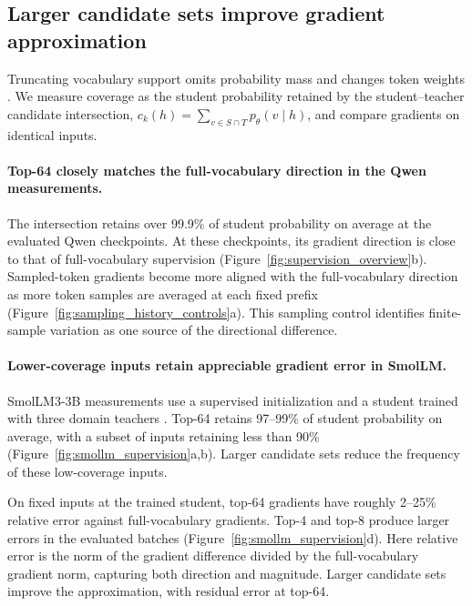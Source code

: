 \subsection{Larger candidate sets improve gradient approximation}
\label{sec:coverage_gradient}

Truncating vocabulary support omits probability mass and changes token weights \citep{anshumann2025sparse,huang2026tailaware}. We measure coverage as the student probability retained by the student--teacher candidate intersection, $c_k(h)=\sum_{v\in S\cap T}p_\theta(v\mid h)$, and compare gradients on identical inputs.

\paragraph{Top-64 closely matches the full-vocabulary direction in the Qwen measurements.}
The intersection retains over 99.9\% of student probability on average at the evaluated Qwen checkpoints. At these checkpoints, its gradient direction is close to that of full-vocabulary supervision (Figure~\ref{fig:supervision_overview}b). Sampled-token gradients become more aligned with the full-vocabulary direction as more token samples are averaged at each fixed prefix (Figure~\ref{fig:sampling_history_controls}a). This sampling control identifies finite-sample variation as one source of the directional difference.

\paragraph{Lower-coverage inputs retain appreciable gradient error in SmolLM.}
SmolLM3-3B measurements use a supervised initialization and a student trained with three domain teachers \citep{gao2026openmopddiagnosingfixingcapability}. Top-64 retains 97--99\% of student probability on average, with a subset of inputs retaining less than 90\% (Figure~\ref{fig:smollm_supervision}a,b). Larger candidate sets reduce the frequency of these low-coverage inputs.

On fixed inputs at the trained student, top-64 gradients have roughly 2--25\% relative error against full-vocabulary gradients. Top-4 and top-8 produce larger errors in the evaluated batches (Figure~\ref{fig:smollm_supervision}d). Here relative error is the norm of the gradient difference divided by the full-vocabulary gradient norm, capturing both direction and magnitude. Larger candidate sets improve the approximation, with residual error at top-64.

